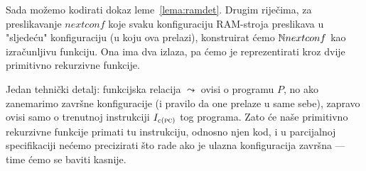 Sada možemo kodirati dokaz leme~\ref{lema:ramdet}. Drugim riječima, za preslikavanje $nextconf$ koje svaku konfiguraciju RAM-stroja preslikava u "sljedeću" konfiguraciju (u koju ova prelazi), konstruirat ćemo ${\mathbb N} nextconf$ kao izračunljivu funkciju. Ona ima dva izlaza, pa ćemo je reprezentirati kroz dvije primitivno rekurzivne funkcije.

Jedan tehnički detalj: funkcijska relacija $\leadsto$ ovisi o programu $P$, no ako zanemarimo završne konfiguracije (i pravilo da one prelaze u same sebe), zapravo ovisi samo o trenutnoj instrukciji $I_{c(\textsc{pc})}$ tog programa. Zato će naše primitivno rekurzivne funkcije primati tu instrukciju, odnosno njen kod, i u parcijalnoj specifikaciji nećemo precizirati što rade ako je ulazna konfiguracija završna --- time ćemo se baviti kasnije.

